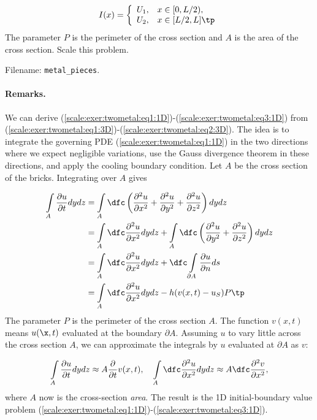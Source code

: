 \documentclass[graybox,envcountchap,sectrefs,final]{svmonodo}
\newcounter{doconce:movie:counter}
\newenvironment{doconceexercise}{}{}
\begin{document}
\begin{doconceexercise}
\[
I(x) = \left\lbrace\begin{array}{ll}
U_1, & x\in [0,L/2),\\ 
U_2, & x\in [L/2, L]\tp
\end{array}\right.
\]
The parameter $P$ is the perimeter of the cross section and $A$ is the
area of the cross section. Scale this problem.


\noindent Filename: \Verb!metal_pieces!.


\paragraph{Remarks.}
We can derive (\ref{scale:exer:twometal:eq1:1D})-(\ref{scale:exer:twometal:eq3:1D}) from (\ref{scale:exer:twometal:eq1:3D})-(\ref{scale:exer:twometal:eq2:3D}).
The idea is to integrate the governing PDE
(\ref{scale:exer:twometal:eq1:1D}) in the two directions where we
expect negligible variations,
use the Gauss divergence theorem in these directions, and
apply the cooling boundary condition. Let $A$ be the cross section of
the bricks. Integrating over $A$ gives

\begin{align*}
\int\limits_A \frac{\partial u}{\partial t}dydz &=
\int\limits_A \dfc\left(
\frac{\partial^2 u}{\partial x^2} +
\frac{\partial^2 u}{\partial y^2} +
\frac{\partial^2 u}{\partial z^2}
\right)dydz \\ 
&=\int\limits_A \dfc
\frac{\partial^2 u}{\partial x^2}
dydz +
\int\limits_A \dfc\left(
\frac{\partial^2 u}{\partial y^2} +
\frac{\partial^2 u}{\partial z^2}
\right)dydz \\ 
& =
\int\limits_A \dfc
\frac{\partial^2 u}{\partial x^2}
dydz +
\dfc\int\limits_{\partial A}\frac{\partial u}{\partial n}ds\\ 
& = \int\limits_A \dfc
\frac{\partial^2 u}{\partial x^2}
dydz -h(v(x,t) -u_S)P\tp
\end{align*}
The parameter $P$ is the perimeter of the cross section $A$.
The function $v(x,t)$ means $u(\x,t)$ evaluated at the boundary $\partial A$.
Assuming $u$ to vary little across the cross section $A$, we can
approximate the integrals by $u$ evaluated at $\partial A$ as $v$:

\[ \int\limits_A \frac{\partial u}{\partial t}dydz\approx A
\frac{\partial}{\partial t} v(x,t),
\quad
\int\limits_A \dfc
\frac{\partial^2 u}{\partial x^2}
dydz \approx A \dfc \frac{\partial^2 v}{\partial x^2},
\]
where $A$ now is the cross-section \emph{area}.
The result is the 1D initial-boundary value problem
(\ref{scale:exer:twometal:eq1:1D})-(\ref{scale:exer:twometal:eq3:1D}).


\end{doconceexercise}
\end{document}
